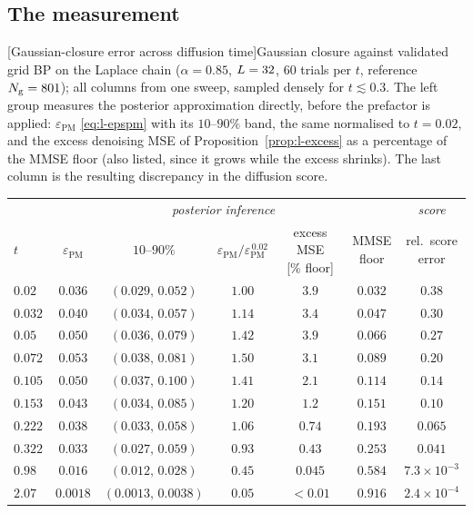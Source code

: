 \subsection{The measurement}

\begin{center}
\begin{minipage}{\linewidth}\centering
{}[Gaussian-closure error across diffusion time]{Gaussian
closure against validated grid BP on the Laplace chain ($\alpha=0.85$,
$L=32$, $60$ trials per $t$, reference $N_{\mathrm{g}}=801$); all columns from
one sweep, sampled densely for $t\lesssim0.3$. The left group measures the
posterior approximation directly, before the  prefactor is applied:
$\varepsilon_{\mathrm{PM}}$ \eqref{eq:l-epspm} with its $10$--$90\%$ band, the
same normalised to $t=0.02$, and the excess denoising MSE of
Proposition~\ref{prop:l-excess} as a percentage of the MMSE floor (also
listed, since it grows while the excess shrinks). The last column is the
resulting discrepancy in the diffusion score.}
\label{tab:l-closure}
\small
\setlength{\tabcolsep}{5pt}
\renewcommand{\arraystretch}{1.1}
\begin{tabular}{@{}lccccc c@{}}
\toprule
& \multicolumn{5}{c}{\textit{posterior inference}}
& \textit{score} \\
\cmidrule(lr){2-6}\cmidrule(l){7-7}
$t$
& $\varepsilon_{\mathrm{PM}}$
& $10$--$90\%$
& $\varepsilon_{\mathrm{PM}}/\varepsilon_{\mathrm{PM}}^{\,0.02}$
& \shortstack{excess MSE\\{}[\% floor]}
& \shortstack{MMSE\\floor}
& \shortstack{rel.\ score\\error} \\
\midrule
$0.02$  & $0.036$  & $(0.029,\,0.052)$   & $1.00$ & $3.9$   & $0.032$ & $0.38$ \\
$0.032$ & $0.040$  & $(0.034,\,0.057)$   & $1.14$ & $3.4$   & $0.047$ & $0.30$ \\
$0.05$  & $0.050$  & $(0.036,\,0.079)$   & $1.42$ & $3.9$   & $0.066$ & $0.27$ \\
$0.072$ & $0.053$  & $(0.038,\,0.081)$   & $\mathbf{1.50}$ & $3.1$ & $0.089$ & $0.20$ \\
$0.105$ & $0.050$  & $(0.037,\,0.100)$   & $1.41$ & $2.1$   & $0.114$ & $0.14$ \\
$0.153$ & $0.043$  & $(0.034,\,0.085)$   & $1.20$ & $1.2$   & $0.151$ & $0.10$ \\
$0.222$ & $0.038$  & $(0.033,\,0.058)$   & $1.06$ & $0.74$  & $0.193$ & $0.065$ \\
$0.322$ & $0.033$  & $(0.027,\,0.059)$   & $0.93$ & $0.43$  & $0.253$ & $0.041$ \\
\addlinespace
$0.98$  & $0.016$  & $(0.012,\,0.028)$   & $0.45$ & $0.045$ & $0.584$ & $7.3\times10^{-3}$ \\
$2.07$  & $0.0018$ & $(0.0013,\,0.0038)$ & $0.05$ & $<0.01$ & $0.916$ & $2.4\times10^{-4}$ \\
\bottomrule
\end{tabular}
\end{minipage}
\end{center}

